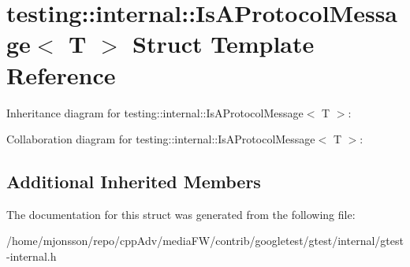 \hypertarget{structtesting_1_1internal_1_1IsAProtocolMessage}{}\section{testing\+:\+:internal\+:\+:Is\+A\+Protocol\+Message$<$ T $>$ Struct Template Reference}
\label{structtesting_1_1internal_1_1IsAProtocolMessage}


Inheritance diagram for testing\+:\+:internal\+:\+:Is\+A\+Protocol\+Message$<$ T $>$\+:


Collaboration diagram for testing\+:\+:internal\+:\+:Is\+A\+Protocol\+Message$<$ T $>$\+:
\subsection*{Additional Inherited Members}


The documentation for this struct was generated from the following file\+:\begin{DoxyCompactItemize}
\item 
/home/mjonsson/repo/cpp\+Adv/media\+F\+W/contrib/googletest/gtest/internal/gtest-\/internal.\+h\end{DoxyCompactItemize}
